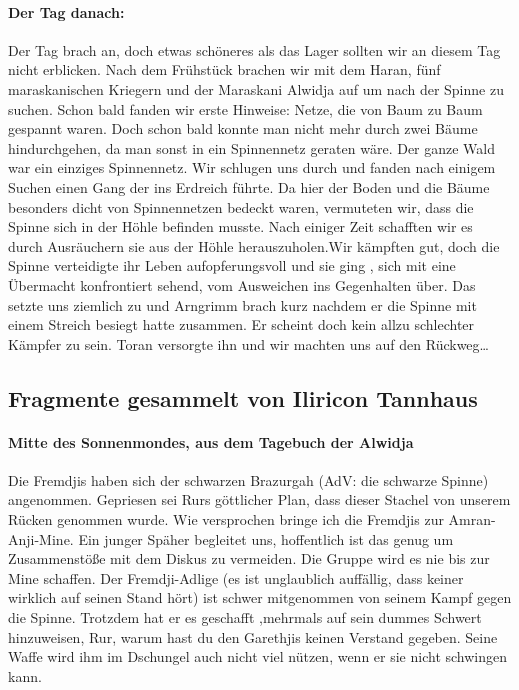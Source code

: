 \paragraph{Der Tag danach:}
Der Tag brach an, doch etwas schöneres als das Lager sollten wir an diesem Tag nicht erblicken. Nach dem Frühstück brachen wir mit dem Haran, fünf maraskanischen Kriegern und der Maraskani Alwidja auf um nach der Spinne zu suchen. Schon bald fanden wir erste Hinweise: Netze, die von Baum zu Baum gespannt waren. Doch schon bald konnte man nicht mehr durch zwei Bäume hindurchgehen, da man sonst in ein Spinnennetz geraten wäre. Der ganze Wald war ein einziges Spinnennetz. Wir schlugen uns durch und fanden nach einigem Suchen einen Gang der ins Erdreich führte. Da hier der Boden und die Bäume besonders dicht von Spinnennetzen bedeckt waren, vermuteten wir, dass die Spinne sich in der Höhle befinden musste. Nach einiger Zeit schafften wir es durch Ausräuchern sie aus der Höhle herauszuholen.Wir kämpften gut, doch die Spinne verteidigte ihr Leben aufopferungsvoll und sie ging , sich mit eine Übermacht konfrontiert sehend, vom Ausweichen ins Gegenhalten über. Das setzte uns ziemlich zu und Arngrimm brach kurz nachdem er die Spinne mit einem Streich besiegt hatte zusammen. Er scheint doch kein allzu schlechter Kämpfer zu sein. Toran versorgte ihn und wir machten uns auf den Rückweg\dots

\subsection{Fragmente gesammelt von Iliricon Tannhaus}

\paragraph{Mitte des Sonnenmondes, aus dem Tagebuch der Alwidja}
Die Fremdjis haben sich der schwarzen Brazurgah (AdV: die schwarze Spinne) angenommen. Gepriesen sei Rurs göttlicher Plan, dass dieser Stachel von unserem Rücken genommen wurde. Wie versprochen bringe ich die Fremdjis zur Amran-Anji-Mine. Ein junger Späher begleitet uns, hoffentlich ist das genug um Zusammenstöße mit dem Diskus zu vermeiden. Die Gruppe wird es nie bis zur Mine schaffen. Der Fremdji-Adlige (es ist unglaublich auffällig, dass keiner wirklich auf seinen Stand hört) ist schwer mitgenommen von seinem Kampf gegen die Spinne. Trotzdem hat er es geschafft ,mehrmals auf sein dummes Schwert hinzuweisen, Rur, warum hast du den Garethjis keinen Verstand gegeben. Seine Waffe wird ihm im Dschungel auch nicht viel nützen, wenn er sie nicht schwingen kann.

